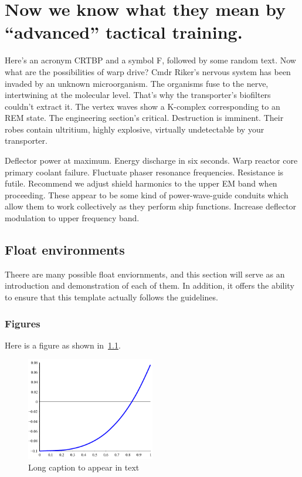 
\chapter{Now we know what they mean by ``advanced'' tactical training.} \label{chap:intro}

Here's an acronym \ac{CRTBP} and a symbol \ac{F}, followed by some random text.
Now what are the possibilities of warp drive? Cmdr Riker's nervous system has been invaded by an unknown microorganism. The organisms fuse to the nerve, intertwining at the molecular level. That's why the transporter's biofilters couldn't extract it. The vertex waves show a K-complex corresponding to an REM state. The engineering section's critical. Destruction is imminent. Their robes contain ultritium, highly explosive, virtually undetectable by your transporter.

Deflector power at maximum. Energy discharge in six seconds. Warp reactor core primary coolant failure. Fluctuate phaser resonance frequencies. Resistance is futile. Recommend we adjust shield harmonics to the upper EM band when proceeding. These appear to be some kind of power-wave-guide conduits which allow them to work collectively as they perform ship functions. Increase deflector modulation to upper frequency band.

\section{Float environments}
Theere are many possible float enviornments, and this section will serve as an introduction and demonstration of each of them.
In addition, it offers the ability to ensure that this template actually follows the guidelines.

\subsection{Figures}\label{ssec:figures}

Here is a figure as shown in~\cref{fig:plain}.

\begin{figure}
    \centering
    \includegraphics[width=0.5\textwidth]{figures/f1_plain.pdf}
    \caption[Short caption for TOC]{Long caption to appear in text\label{fig:plain}}
\end{figure}

